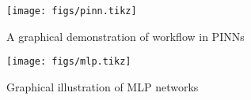 
\lipsum[1]

\begin{figure*}[!t]
    \centering
    \normalsize
    \texttt{[image: figs/pinn.tikz]} 
    \caption[
        A graphical demonstration of workflow in PINNs
    ]{
        A graphical demonstration of workflow in PINNs
    }
    \label{fig:pinn-workflow}
\end{figure*}

\lipsum[2]

\begin{figure}[!hbt]
    \small
    \texttt{[image: figs/mlp.tikz]}
    \caption[
        Graphical illustration of MLP networks
    ]{
        Graphical illustration of MLP networks
    }
    \label{fig:mlp-graph}
\end{figure}

\lipsum[3-10]

